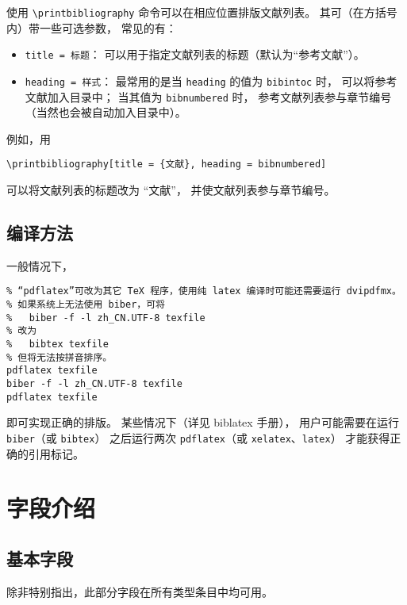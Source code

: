 \documentclass[UTF8, fancyhdr, hyperref]{ctexart}
\begin{document}
使用 \verb|\printbibliography| 命令可以在相应位置排版文献列表。
其可（在方括号内）带一些可选参数\supercite{biblatex}，
常见的有：
\begin{itemize}
	\item \verb|title = 标题|：
		可以用于指定文献列表的标题（默认为“参考文献”）。
	\item \verb|heading = 样式|：
		最常用的是当 \verb|heading| 的值为 \verb|bibintoc| 时，
		可以将参考文献加入目录中；
		当其值为 \verb|bibnumbered| 时，
		参考文献列表参与章节编号（当然也会被自动加入目录中）。
\end{itemize}

例如，用
\begin{Verbatim}[frame = single]
\printbibliography[title = {文献}, heading = bibnumbered]
\end{Verbatim}
可以将文献列表的标题改为 “文献”，
并使文献列表参与章节编号。

\subsection{编译方法}

一般情况下，
\begin{Verbatim}[frame = single]
% “texfile”是被 TeX 编译的文件名中除去“.tex”的部分。
% “pdflatex”可改为其它 TeX 程序，使用纯 latex 编译时可能还需要运行 dvipdfmx。
% 如果系统上无法使用 biber，可将
%   biber -f -l zh_CN.UTF-8 texfile
% 改为
%   bibtex texfile
% 但将无法按拼音排序。
pdflatex texfile
biber -f -l zh_CN.UTF-8 texfile
pdflatex texfile
\end{Verbatim}
即可实现正确的排版。
某些情况下（详见 biblatex 手册\supercite{biblatex}），
用户可能需要在运行 \verb|biber|（或 \verb|bibtex|）
之后运行两次 \verb|pdflatex|（或 \verb|xelatex|、\verb|latex|）
才能获得正确的引用标记。

\section{字段介绍}\label{sec:fields}
\subsection{基本字段}

除非特别指出，此部分字段在所有类型条目中均可用。
\end{document}
